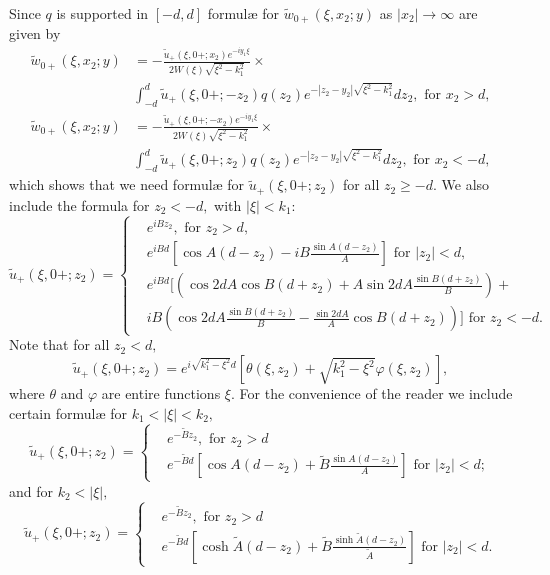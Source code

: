 \documentclass[11pt]{article}
\newcommand\tA{\widetilde A}
\newcommand\tB{\widetilde B}
\newcommand\tu{\widetilde u}
\newcommand\tw{\tilde w_{0+}}
\theoremstyle{definition}
\theoremstyle{remark}
\begin{document}
Since $q$ is supported in $[-d,d]$ formul{\ae} for $\tw(\xi,x_2;y)$ as $|x_2|\to\infty$
are given by
\begin{equation}\label{eqn92.55}
  \begin{split}
    \tw(\xi,x_2;y)&=-\frac{\tu_+(\xi,0+;x_2) e^{-iy_1\xi}}{2W(\xi)\sqrt{\xi^2-k_1^2}}\times
    \\&\int_{-d}^{d}\tu_+(\xi,0+;-z_2)q(z_2)
    e^{-|z_2-y_2|\sqrt{\xi^2-k_1^2}}dz_2,\text{ for }x_2>d,\\
     \tw(\xi,x_2;y)&=-\frac{\tu_+(\xi,0+;-x_2)e^{-iy_1\xi}}{2W(\xi)\sqrt{\xi^2-k_1^2}}\times
     \\&\int_{-d}^{d}\tu_+(\xi,0+;z_2)q(z_2)
    e^{-|z_2-y_2|\sqrt{\xi^2-k_1^2}}dz_2,\text{ for }x_2<-d,
  \end{split}
\end{equation}
which shows that we need formul{\ae} for $\tu_+(\xi,0+;z_2)$ for all $z_2\geq
-d.$ We also include the formula for $z_2<-d,$ with $|\xi|<k_1:$ 
\begin{equation}
   \tu_+(\xi,0+;z_2)=
    \begin{cases}
      &e^{iBz_2},\text{ for }z_2>d,\\
      &e^{iBd}\left[\cos A(d-z_2)-iB\frac{\sin
          A(d-z_2)}{A}\right]\text{ for }|z_2|<d,\\
      &e^{iBd}\Big[\left(\cos 2dA \cos B(d+z_2)+A\sin 2dA\frac{\sin
          B(d+z_2)}{B}\right)
        +\\ &iB\left(\cos 2dA\frac{\sin B(d+z_2)}{B}-\frac{\sin 2d
          A}{A}\cos B(d+z_2)\right)\Big]\text{ for }z_2<-d.
    \end{cases}
\end{equation}
Note that for all $z_2<d,$
$$\tu_+(\xi,0+;z_2)=e^{i\sqrt{k_1^2-\xi^2}d}\left[\theta(\xi,z_2)+
  \sqrt{k_1^2-\xi^2}\varphi(\xi,z_2)\right],$$
where $\theta$ and $\varphi$ are entire functions $\xi.$ For the
convenience of the reader we include certain formul{\ae} for $k_1<|\xi|<k_2,$
\begin{equation}
   \tu_+(\xi,0+;z_2)=
    \begin{cases}
      &e^{-\tB z_2},\text{ for }z_2>d\\
      &e^{-\tB d}\left[\cos A(d-z_2)+\tB\frac{\sin A(d-z_2)}{A}\right]\text{ for }|z_2|<d;
    \end{cases}
\end{equation}
and for $k_2<|\xi|,$
\begin{equation}
   \tu_+(\xi,0+;z_2)=
    \begin{cases}
      &e^{-\tB z_2},\text{ for }z_2>d\\
      &e^{-\tB d}\left[\cosh \tA(d-z_2)+\tB\frac{\sinh \tA(d-z_2)}{\tA}\right]\text{ for }|z_2|<d.
    \end{cases}
\end{equation}
\end{document}
